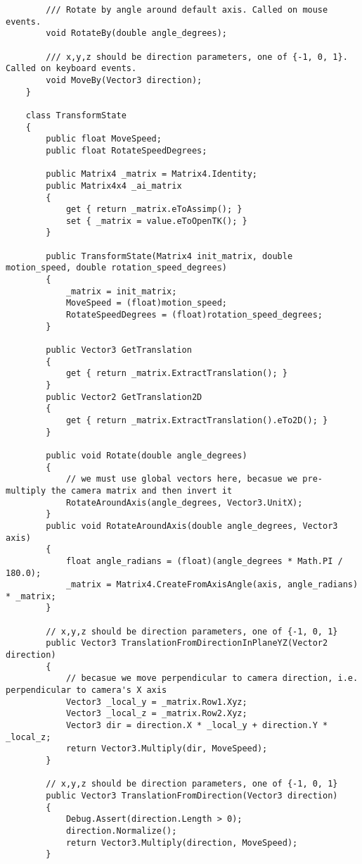 \begin{scriptsize}
\begin{verbatim}
        /// Rotate by angle around default axis. Called on mouse events.
        void RotateBy(double angle_degrees);

        /// x,y,z should be direction parameters, one of {-1, 0, 1}. Called on keyboard events.
        void MoveBy(Vector3 direction);
    }

    class TransformState
    {
        public float MoveSpeed;
        public float RotateSpeedDegrees;

        public Matrix4 _matrix = Matrix4.Identity;
        public Matrix4x4 _ai_matrix
        {
            get { return _matrix.eToAssimp(); }
            set { _matrix = value.eToOpenTK(); }
        }

        public TransformState(Matrix4 init_matrix, double motion_speed, double rotation_speed_degrees)
        {
            _matrix = init_matrix;
            MoveSpeed = (float)motion_speed;
            RotateSpeedDegrees = (float)rotation_speed_degrees;
        }

        public Vector3 GetTranslation
        {
            get { return _matrix.ExtractTranslation(); }
        }
        public Vector2 GetTranslation2D
        {
            get { return _matrix.ExtractTranslation().eTo2D(); }
        }

        public void Rotate(double angle_degrees)
        {
            // we must use global vectors here, becasue we pre-multiply the camera matrix and then invert it
            RotateAroundAxis(angle_degrees, Vector3.UnitX);
        }
        public void RotateAroundAxis(double angle_degrees, Vector3 axis)
        {
            float angle_radians = (float)(angle_degrees * Math.PI / 180.0);
            _matrix = Matrix4.CreateFromAxisAngle(axis, angle_radians) * _matrix;
        }

        // x,y,z should be direction parameters, one of {-1, 0, 1}
        public Vector3 TranslationFromDirectionInPlaneYZ(Vector2 direction)
        {
            // becasue we move perpendicular to camera direction, i.e. perpendicular to camera's X axis
            Vector3 _local_y = _matrix.Row1.Xyz;
            Vector3 _local_z = _matrix.Row2.Xyz;
            Vector3 dir = direction.X * _local_y + direction.Y * _local_z;
            return Vector3.Multiply(dir, MoveSpeed);
        }

        // x,y,z should be direction parameters, one of {-1, 0, 1}
        public Vector3 TranslationFromDirection(Vector3 direction)
        {
            Debug.Assert(direction.Length > 0);
            direction.Normalize();
            return Vector3.Multiply(direction, MoveSpeed);
        }


\end{verbatim}
\end{scriptsize}
